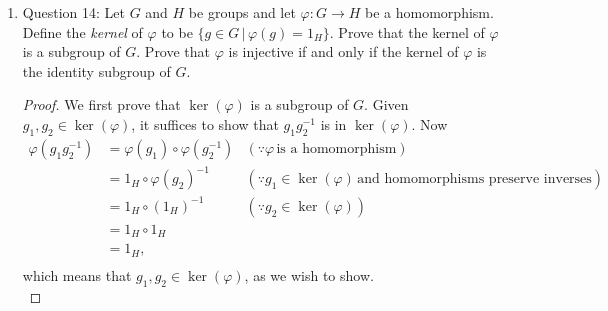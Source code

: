 \documentclass{article}
\begin{document}
\begin{enumerate}
\begin{enumerate}
\begin{proof}
          \begin{align*}
            \varphi(g_1g_2^{-1})      & = \varphi(g_1)\circ\varphi(g_2^{-1})  & (\because\varphi\,\text{is a homomorphism}) \\
              & = \varphi(g_1)\circ\varphi(g_2)^{-1} & (\because\text{homomorphisms preserve inverses}) \\
              & = h_1\circ h_2^{-1},  & (\because h_1=\varphi(g_1)\,\text{and}\,h_2=\varphi(g_2)) \\
          \end{align*}
          which implies $h_1\circ h_2^{-1}\in \varphi(G)$, as we wish to
          show. \\

          Assume that $\varphi$ is injective.
          $\varphi\upharpoonright\varphi(G)$ is clearly surjective, so
          $\varphi$ is a bijective homomorphism. It suffices to show that
          all bijective homomorphisms are isomorphisms, for which we just
          need to show that the inverse map $\varphi^{-1}$ is a
          homomorphism. Let $h_1,h_2\in\varphi(G)$. Then there exists
          $g_1,g_2\in G$ such that $h_1=\varphi(g_1)$ and
          $h_2=\varphi(g_2)$. By homomorphism of $\varphi$,
          $\varphi(g_1g_2)=h_1\circ h_2$. Then by bijectiveness of
          $\varphi$, $\varphi^{-1}(h_1\circ
          h_2)=g_1g_2=\varphi(h_1)\varphi(h_2)$, which proves the
          homomorphism of $\varphi^{-1}$. 
        \end{proof}

      \item Question 14: Let $G$ and $H$ be groups and let
        $\varphi:G\rightarrow H$ be a homomorphism. Define the
        \textit{kernel} of $\varphi$ to be $\{g\in G\,|\,\varphi(g)=1_H\}$.
        Prove that the kernel of $\varphi$ is a subgroup of $G$. Prove that
        $\varphi$ is injective if and only if the kernel of $\varphi$ is
        the identity subgroup of $G$.

        \begin{proof}
          We first prove that $\ker(\varphi)$ is a subgroup of $G$. Given
          $g_1,g_2\in\ker(\varphi)$, it suffices to show that $g_1g_2^{-1}$
          is in $\ker(\varphi)$. Now
          \begin{align*}
            \varphi(g_1g_2^{-1})  & = \varphi(g_1)\circ\varphi(g_2^{-1})  &
            (\because\varphi\,\text{is a homomorphism}) \\
              & = 1_H\circ\varphi(g_2)^{-1} & (\because
              g_1\in\ker(\varphi)\,\text{and homomorphisms preserve inverses}) \\
              & = 1_H\circ(1_H)^{-1}        & (\because g_2\in\ker(\varphi)) \\
              & = 1_H\circ1_H \\
              & = 1_H, \\
          \end{align*}
          which means that $g_1,g_2\in\ker(\varphi)$, as we wish to show.
          \\


\end{proof}
\end{enumerate}
\end{enumerate}
\end{document}
